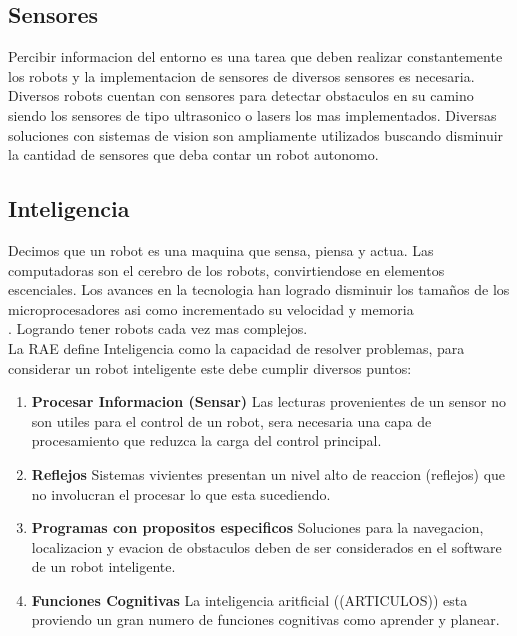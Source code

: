 \documentclass[11pt,epsf,times]{article}
\begin{document}
\subsection*{Sensores}

  Percibir informacion del entorno es una tarea que deben realizar constantemente los robots y la implementacion de sensores de diversos sensores es necesaria. Diversos robots cuentan con sensores para detectar obstaculos en su camino siendo los sensores de tipo ultrasonico o lasers los mas implementados. Diversas soluciones con sistemas de vision son ampliamente utilizados buscando disminuir la cantidad de sensores que deba contar un robot autonomo.
  
\subsection*{Inteligencia}
  
  Decimos que un robot es una maquina que sensa, piensa y actua. Las computadoras son el cerebro de los robots, convirtiendose en elementos escenciales. Los avances en la tecnologia han logrado disminuir los tama\~{n}os de los microprocesadores asi como incrementado su velocidad y memoria\\.
  Logrando tener robots cada vez mas complejos.\\
  
  La RAE define Inteligencia como la capacidad de resolver problemas, para considerar un robot inteligente este debe cumplir diversos puntos:\\
  
  \begin{enumerate}
  \item \textbf{Procesar Informacion (Sensar)} Las lecturas provenientes de un sensor no son utiles para el control de un robot, sera necesaria una capa de procesamiento que reduzca la carga del control principal.\\
    
  \item \textbf{Reflejos} Sistemas vivientes presentan un nivel alto de reaccion (reflejos) que no involucran el procesar lo que esta sucediendo.\\
    
  \item \textbf{Programas con propositos especificos} Soluciones para la navegacion, localizacion y evacion de obstaculos deben de ser considerados en el software de un robot inteligente.\\

  \item \textbf{Funciones Cognitivas} La inteligencia aritficial ((ARTICULOS)) esta proviendo un gran numero de funciones cognitivas como aprender y planear.\\
  \end{enumerate}
\end{document}
